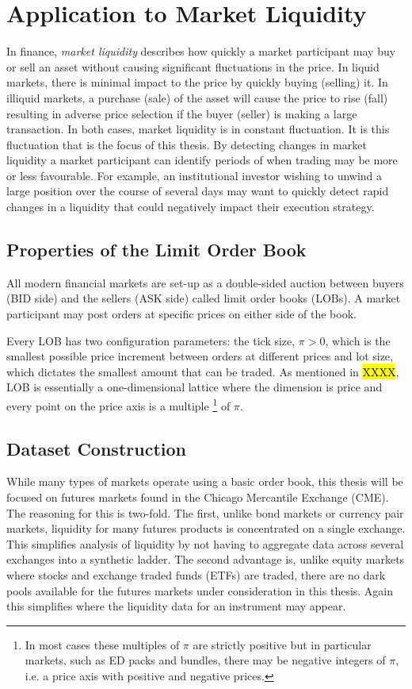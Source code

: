 \chapter{Application to Market Liquidity}

In finance, \textit{market liquidity} describes how quickly a market participant may buy or sell an asset without causing significant fluctuations in the price. In liquid markets, there is minimal impact to the price by quickly buying (selling) it. In illiquid markets, a purchase (sale) of the asset will cause the price to rise (fall) resulting in adverse price selection if the buyer (seller) is making a large transaction. In both cases, market liquidity is in constant fluctuation. It is this fluctuation that is the focus of this thesis. 
By detecting changes in market liquidity a market participant can identify periods of when trading may be more or less favourable. For example, an institutional investor wishing to unwind a large position over the course of several days may want to quickly detect rapid changes in a liquidity that could negatively impact their execution strategy.

\section{Properties of the Limit Order Book}

All modern financial markets are set-up as a double-sided auction between buyers (BID side) and the sellers (ASK side) called limit order books (LOBs). A market participant may post orders at specific prices on either side of the book.  

Every LOB has two configuration parameters: the tick size, $\pi >0$, which is the smallest possible price increment between orders at different prices and lot size, which dictates the smallest amount that can be traded. As mentioned in \hl{XXXX}, LOB is essentially a one-dimensional lattice where the dimension is price and every point on the price axis is a multiple \footnote{In most cases these multiples of $\pi$ are strictly positive but in particular markets, such as ED packs and bundles, there may be negative integers of $\pi$, i.e. a price axis with positive and negative prices.} of $\pi$.

\section{Dataset Construction}

While many types of markets operate using a basic order book, this thesis will be focused on futures markets found in the Chicago Mercantile Exchange (CME). The reasoning for this is two-fold. The first, unlike bond markets or currency pair markets, liquidity for many futures products is concentrated on a single exchange. This simplifies analysis of liquidity by not having to aggregate data across several exchanges into a synthetic ladder. The second advantage is, unlike equity markets where stocks and exchange traded funds (ETFs) are traded, there are no dark pools available for the futures markets under consideration in this thesis. Again this simplifies where the liquidity data for an instrument may appear.

